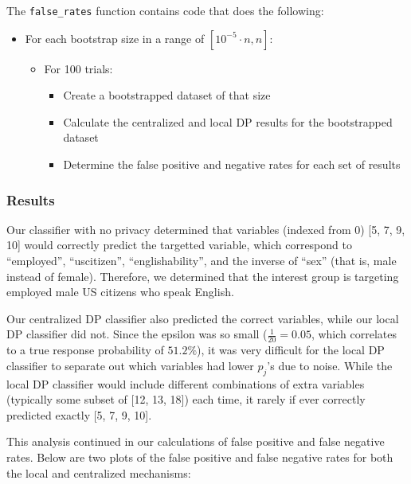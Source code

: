 \documentclass[12pt]{article}
\def\cl{\lstinline}
\begin{document}
\bigskip

The \cl{false_rates} function contains code that does the following:
\begin{itemize}
  \item For each bootstrap size in a range of $[10^{-5} \cdot n, n]$:
  \begin{itemize}
    \item For 100 trials:
    \begin{itemize}
      \item Create a bootstrapped dataset of that size
      \item Calculate the centralized and local DP results for the bootstrapped dataset
      \item Determine the false positive and negative rates for each set of results
    \end{itemize}
  \end{itemize}
\end{itemize}

\subsubsection{Results}

\noindent

Our classifier with no privacy determined that variables (indexed from 0) [5, 7, 9, 10] would correctly predict the targetted variable, which correspond to ``employed'', ``uscitizen'', ``englishability'', and the inverse of ``sex'' (that is, male instead of female). Therefore, we determined that the interest group is targeting employed male US citizens who speak English.

\bigskip

Our centralized DP classifier also predicted the correct variables, while our local DP classifier did not. Since the epsilon was so small ($\frac{1}{20} = 0.05$, which correlates to a true response probability of $51.2\%$), it was very difficult for the local DP classifier to separate out which variables had lower $p_j$'s due to noise. While the local DP classifier would include different combinations of extra variables (typically some subset of [12, 13, 18]) each time, it rarely if ever correctly predicted exactly [5, 7, 9, 10].

\bigskip

This analysis continued in our calculations of false positive and false negative rates. Below are two plots of the false positive and false negative rates for both the local and centralized mechanisms:
\end{document}

